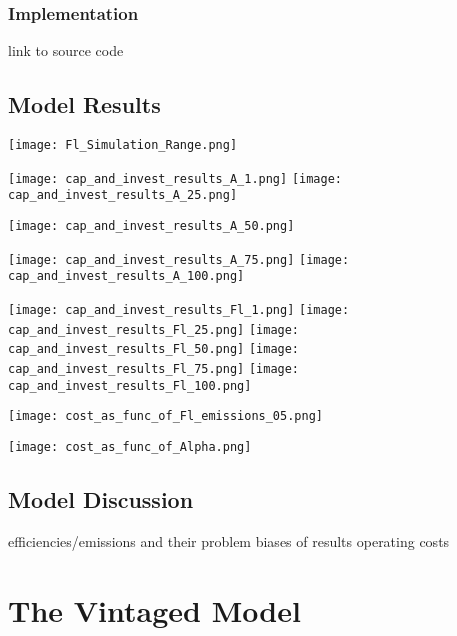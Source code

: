 \documentclass[singlespace]{easychithesis}
\begin{document}
\subsection{Implementation}
link to source code



\section{Model Results}


\texttt{[image: Fl\_Simulation\_Range.png]}


\texttt{[image: cap\_and\_invest\_results\_A\_1.png]}
\texttt{[image: cap\_and\_invest\_results\_A\_25.png]}


\texttt{[image: cap\_and\_invest\_results\_A\_50.png]}

\texttt{[image: cap\_and\_invest\_results\_A\_75.png]}
\texttt{[image: cap\_and\_invest\_results\_A\_100.png]}




\texttt{[image: cap\_and\_invest\_results\_Fl\_1.png]}
\texttt{[image: cap\_and\_invest\_results\_Fl\_25.png]}
\texttt{[image: cap\_and\_invest\_results\_Fl\_50.png]}
\texttt{[image: cap\_and\_invest\_results\_Fl\_75.png]}
\texttt{[image: cap\_and\_invest\_results\_Fl\_100.png]}




\texttt{[image: cost\_as\_func\_of\_Fl\_emissions\_05.png]}



\texttt{[image: cost\_as\_func\_of\_Alpha.png]}










\section{Model Discussion}

efficiencies/emissions and their problem
biases of results
operating costs 





\chapter{The Vintaged Model}
\end{document}
